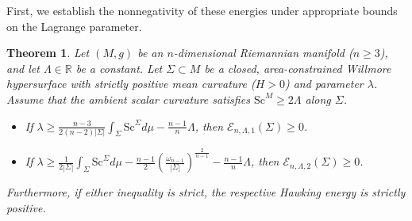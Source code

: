 \documentclass[12pt,a4paper]{amsart}
\theoremstyle{plain}
\newtheorem{theorem}{Theorem}[section]
\theoremstyle{definition}
\begin{document}
First, we establish the nonnegativity of these energies under appropriate bounds on the Lagrange parameter.
\begin{theorem}\label{thm:unified_positivity}
Let $(M,g)$ be an $n$-dimensional Riemannian manifold ($n\geq 3$), and let $\Lambda \in \mathbb{R}$ be a constant. Let $\Sigma \subset M$ be a closed, area-constrained Willmore hypersurface with strictly positive mean curvature ($H > 0$) and parameter $\lambda$. Assume that the ambient scalar curvature satisfies $\mathrm{Sc}^M \ge 2\Lambda$ along $\Sigma$.
\begin{itemize}
    \item[$(i)$] If $\label{unified_bound_1}
    \lambda \geq \frac{n-3}{2(n-2)|\Sigma|} \int_{\Sigma} \mathrm{Sc}^{\Sigma} d\mu - \frac{n-1}{n}\Lambda$,
then $\mathcal{E}_{n,\Lambda,1}(\Sigma)\geq 0$.
    \item[$(ii)$] If $
    \lambda \geq \frac{1}{2|\Sigma|}\int_{\Sigma} \mathrm{Sc}^{\Sigma} d\mu - \frac{n-1}{2} \left( \frac{\omega_{n-1}}{ |\Sigma|} \right)^{\frac{2}{n-1}} - \frac{n-1}{n}\Lambda$,
then $\mathcal{E}_{n,\Lambda,2}(\Sigma)\geq 0$.
\end{itemize}
Furthermore, if either inequality is strict, the respective Hawking energy is strictly positive.
\end{theorem}
\end{document}
